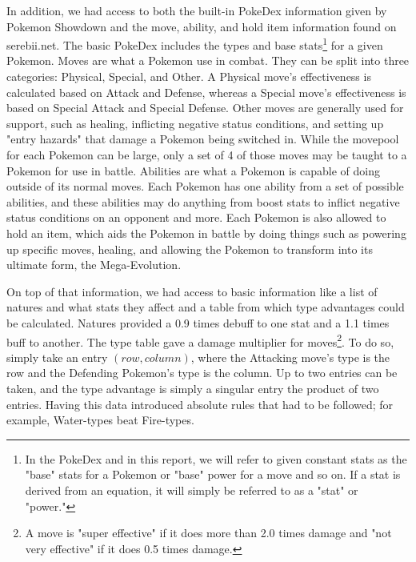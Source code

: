 \documentclass{acm_proc_article-sp}
\begin{document}
In addition, we had access to both the built-in PokeDex information given by Pokemon Showdown and the move, ability, and hold item information found on serebii.net. The basic PokeDex includes the types and base stats\footnote{ In the PokeDex and in this report, we will refer to given constant stats as the "base" stats for a Pokemon or "base" power for a move and so on. If a stat is derived from an equation, it will simply be referred to as a "stat" or "power."} for a given Pokemon. Moves are what a Pokemon use in combat. They can be split into three categories: Physical, Special, and Other. A Physical move's effectiveness is calculated based on Attack and Defense, whereas a Special move's effectiveness is based on Special Attack and Special Defense. Other moves are generally used for support, such as healing, inflicting negative status conditions, and setting up "entry hazards" that damage a Pokemon being switched in. While the movepool for each Pokemon can be large, only a set of 4 of those moves may be taught to a Pokemon for use in battle. Abilities are what a Pokemon is capable of doing outside of its normal moves. Each Pokemon has one ability from a set of possible abilities, and these abilities may do anything from boost stats to inflict negative status conditions on an opponent and more. Each Pokemon is also allowed to hold an item, which aids the Pokemon in battle by doing things such as powering up specific moves, healing, and allowing the Pokemon to transform into its ultimate form, the Mega-Evolution.

On top of that information, we had access to basic information like a list of natures and what stats they affect and a table from which type advantages could be calculated. Natures provided a 0.9 times debuff to one stat and a 1.1 times buff to another. The type table gave a damage multiplier for moves\footnote{A move is "super effective" if it does more than 2.0 times damage and "not very effective" if it does 0.5 times damage.}. To do so, simply take an entry $(row, column)$, where the Attacking move's type is the row and the Defending Pokemon's type is the column. Up to two entries can be taken, and the type advantage is simply a singular entry the product of two entries. Having this data introduced absolute rules that had to be followed; for example, Water-types beat Fire-types.
\end{document}
